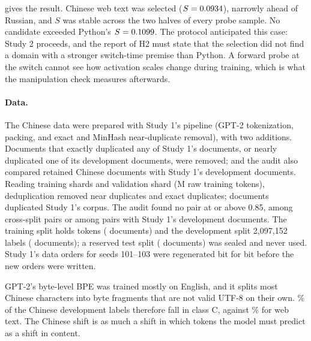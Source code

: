 \documentclass[11pt]{article}
\begin{document}
\begin{table}[t]
\centering
\small
\caption{Domain selection: the statistic $S$ for each candidate, overall, per condition and on each half of the
probe sample (windows 1--128 and 129--256). Python is computed the same way on Study 1's Python probe, as the
reference.}
\label{tab:s2selection}

\end{table}

 gives the result. Chinese web text was selected ($S = 0.0934$), narrowly ahead of
Russian, and $S$ was stable across the two halves of every probe sample. No candidate exceeded Python's
$S = 0.1099$. The protocol anticipated this case: Study 2 proceeds, and the report of H2 must state that the
selection did not find a domain with a stronger switch-time premise than Python. A forward probe at the switch
cannot see how activation scales change during training, which is what the manipulation check measures
afterwards.

\paragraph{Data.} The Chinese data were prepared with Study 1's pipeline (GPT-2 tokenization, packing, and exact
and MinHash near-duplicate removal), with two additions. Documents that exactly duplicated any of Study 1's
documents, or nearly duplicated one of its development documents, were removed; and the audit also compared
retained Chinese documents with Study 1's development documents. Reading \twoTrainShards{} training shards and
\twoValShards{} validation shard (\twoRawTrain M raw training tokens), deduplication removed \twoNearRemoved{} near
duplicates and \twoExactRemoved{} exact duplicates; \twoFrozenRemoved{} documents duplicated Study 1's corpus. The
audit found no pair at or above 0.85, among \twoAuditPairs{} cross-split pairs or among
\twoFrozenPairs{} pairs with Study 1's development documents. The training split holds \twoTrainTokens{} tokens
(\twoTrainDocs{} documents) and the development split 2{,}097{,}152 labels (\twoDevDocs{} documents); a reserved
test split (\twoTestDocs{} documents) was sealed and never used. Study 1's data orders for seeds 101--103 were
regenerated bit for bit before the new orders were written.

GPT-2's byte-level BPE \citep{radford2019gpt2} was trained mostly on English, and it splits most Chinese
characters into byte fragments that are not valid UTF-8 on their own. \twoCtrlShare\% of the Chinese development
labels therefore fall in class C, against \webCtrlShare\% for web text. The Chinese shift is as much a shift in
which tokens the model must predict as a shift in content.
\end{document}
